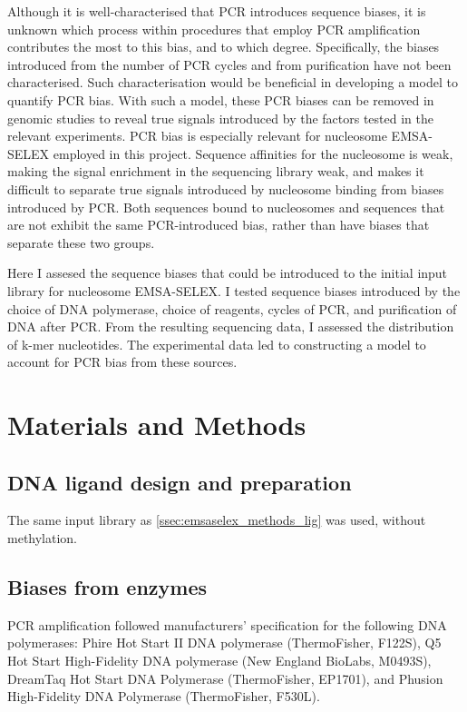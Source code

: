 \documentclass[parskip=full, numbers=noenddot]{scrreprt}
\begin{document}
Although it is well-characterised that PCR introduces sequence biases, it is unknown which process within procedures that employ PCR amplification contributes the most to this bias, and to which degree.  Specifically, the biases introduced from the number of PCR cycles and from purification have not been characterised.  Such characterisation would be beneficial in developing a model to quantify PCR bias.  With such a model, these PCR biases can be removed in genomic studies to reveal true signals introduced by the factors tested in the relevant experiments.  PCR bias is especially relevant for nucleosome EMSA-SELEX employed in this project.  Sequence affinities for the nucleosome is weak, making the signal enrichment in the sequencing library weak, and makes it difficult to separate true signals introduced by nucleosome binding from biases introduced by PCR.  Both sequences bound to nucleosomes and sequences that are not exhibit the same PCR-introduced bias, rather than have biases that separate these two groups.

Here I assesed the sequence biases that could be introduced to the initial input library for nucleosome EMSA-SELEX.  I tested sequence biases introduced by the choice of DNA polymerase, choice of reagents, cycles of PCR, and purification of DNA after PCR.  From the resulting sequencing data, I assessed the distribution of k-mer nucleotides.  The experimental data led to constructing a model to account for PCR bias from these sources.

\section{Materials and Methods}
\label{sec:pcrbias_methods}

\subsection{DNA ligand design and preparation}
\label{ssec:pcrbias_methods_lig}

The same input library as \ref{ssec:emsaselex_methods_lig} was used, without methylation.

\subsection{Biases from enzymes}
\label{ssec:pcrbias_methods_enz}

PCR amplification followed manufacturers' specification for the following DNA polymerases: Phire Hot Start II DNA polymerase (ThermoFisher, F122S), Q5 Hot Start High-Fidelity DNA polymerase (New England BioLabs, M0493S), DreamTaq Hot Start DNA Polymerase (ThermoFisher, EP1701), and Phusion High-Fidelity DNA Polymerase (ThermoFisher, F530L).
\end{document}
